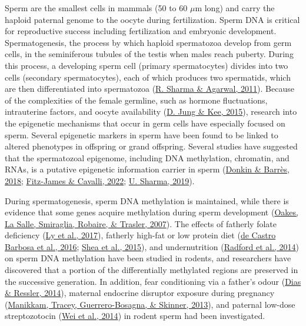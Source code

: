 \documentclass[12pt,twoside]{reedthesis}
\begin{document}
Sperm are the smallest cells in mammals (50 to 60 \(\mu\)m long) and carry
the haploid paternal genome to the oocyte during fertilization. Sperm
DNA is critical for reproductive success including fertilization and
embryonic development. Spermatogenesis, the process by which haploid
spermatozoa develop from germ cells, in the seminiferous tubules of the
testis when males reach puberty. During this process, a developing sperm
cell (primary spermatocytes) divides into two cells (secondary
spermatocytes), each of which produces two spermatids, which are then
differentiated into spermatozoa (\protect\hyperlink{ref-sharma2011}{R. Sharma \& Agarwal, 2011}). Because of the
complexities of the female germline, such as hormone fluctuations,
intrauterine factors, and oocyte availability (\protect\hyperlink{ref-jung2015}{D. Jung \& Kee, 2015}), research into
the epigenetic mechanisms that occur in germ cells have especially
focused on sperm. Several epigenetic markers in sperm have been found to
be linked to altered phenotypes in offspring or grand offspring. Several
studies have suggested that the spermatozoal epigenome, including DNA
methylation, chromatin, and RNAs, is a putative epigenetic information
carrier in sperm (\protect\hyperlink{ref-donkin2018}{Donkin \& Barrès, 2018}; \protect\hyperlink{ref-fitz-james2022}{Fitz-James \& Cavalli, 2022}; \protect\hyperlink{ref-sharma2019}{U. Sharma, 2019}).

During spermatogenesis, sperm DNA methylation is maintained, while there
is evidence that some genes acquire methylation during sperm development
(\protect\hyperlink{ref-oakes2007}{Oakes, La Salle, Smiraglia, Robaire, \& Trasler, 2007}). The effects of fatherly folate deficiency (\protect\hyperlink{ref-ly2017}{Ly et al., 2017}),
fatherly high-fat or low protein diet (\protect\hyperlink{ref-decastrobarbosa2016}{de Castro Barbosa et al., 2016}; \protect\hyperlink{ref-shea2015}{Shea et al., 2015}),
and undernutrition (\protect\hyperlink{ref-radford2014}{Radford et al., 2014}) on sperm DNA methylation have been
studied in rodents, and researchers have discovered that a portion of
the differentially methylated regions are preserved in the successive
generation. In addition, fear conditioning via a father's odour
(\protect\hyperlink{ref-dias2014}{Dias \& Ressler, 2014}), maternal endocrine disruptor exposure during pregnancy
(\protect\hyperlink{ref-manikkam2013}{Manikkam, Tracey, Guerrero-Bosagna, \& Skinner, 2013}), and paternal low-dose streptozotocin (\protect\hyperlink{ref-wei2014}{Wei et al., 2014}) in
rodent sperm had been investigated.
\end{document}
